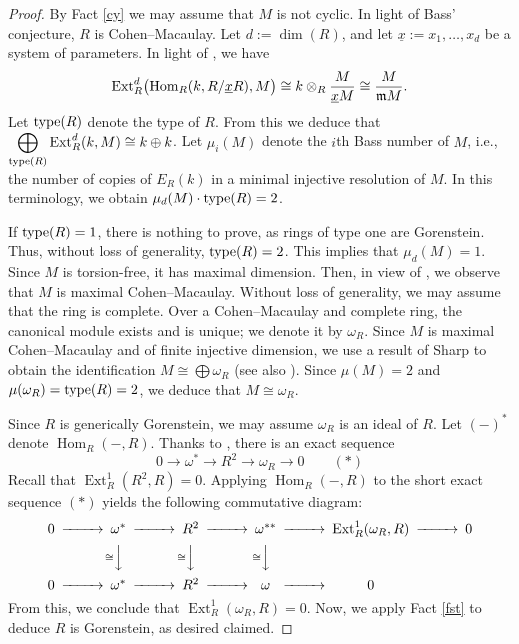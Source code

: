 \documentclass[10. pt,a4paper]{amsart}
\theoremstyle{definition}
\theoremstyle{remark}
\newcommand{\Ext}{\operatorname{Ext}}
\newcommand{\Hom}{\operatorname{Hom}}
\newcommand{\fm}{\frak{m}}
\begin{document}
\begin{proof}
	By Fact \ref{cy} we may assume that $M$ is not cyclic. In light of Bass'  conjecture, $R$ is Cohen--Macaulay. Let $d := \dim(R)$, and let $\underline{x} := x_1,\ldots,x_d$ be a system of parameters. In light of \cite[II.5.4]{PS}, we have
	\[
	\Ext_R^d\bigl(\Hom_R(k,R/\underline{x}R), M\bigr) \cong k \otimes_R \frac{M}{\underline{x}M} \cong \frac{M}{\fm M}.
	\]
	Let $\operatorname{type}(R)$ denote the type of $R$. From this we deduce that $\displaystyle \bigoplus_{\type(R)} \Ext_R^d(k,M) \cong k \oplus k$. Let $\mu_i(M)$ denote the $i$th Bass number of $M$, i.e., the number of copies of $E_R(k)$ in a minimal injective resolution of $M$. In this terminology, we obtain $\mu_d(M) \cdot \operatorname{type}(R) = 2$.
	
	If $\operatorname{type}(R) = 1$, there is nothing to prove, as rings of type one are Gorenstein. Thus, without loss of generality, $\operatorname{type}(R) = 2$. This implies that $\mu_d(M) = 1$. Since $M$ is torsion-free, it has maximal dimension. Then, in view of \cite[3.4.c]{fo}, we observe that $M$ is maximal Cohen--Macaulay. Without loss of generality, we may assume that the ring is complete. Over a Cohen--Macaulay and complete ring, the canonical module exists and is unique; we denote it by $\omega_R$. Since $M$ is maximal Cohen--Macaulay and of finite injective dimension, we use a result of Sharp \cite{sha} to obtain the identification $M \cong \bigoplus \omega_R$ (see also \cite[3.3.28]{BH}). Since $\mu(M) = 2$ and $\mu(\omega_R) = \operatorname{type}(R) = 2$, we deduce that $M \cong \omega_R$.
	
Since $R$ is generically Gorenstein, we may assume $\omega_R$ is an ideal of $R$.	Let $(-)^\ast$ denote $\Hom_R(-,R)$. Thanks to \cite[Appendix]{hh}, there is an exact sequence
	\[
	0 \longrightarrow \omega^\ast \longrightarrow R^2 \longrightarrow \omega_R \longrightarrow 0 \qquad (\ast)
	\]
	Recall that $\Ext_R^1(R^2,R) = 0$. Applying $\Hom_R(-,R)$ to the short exact sequence $(\ast)$ yields the following commutative diagram:
	\[
	\begin{CD}
	0 @>>> \omega^\ast @>>> R^2 @>>> \omega^{\ast\ast} @>>> \Ext_R^1(\omega_R,R) @>>> 0 \\
	@. @V{\cong}VV @V{\cong}VV @V{\cong}VV @. \\
	0 @>>> \omega^\ast @>>> R^2 @>>> \omega @>>> 0\\
\end{CD}
	\]
	From this, we conclude that $\Ext_R^1(\omega_R,R) = 0$. Now, we apply {Fact} \ref{fst}  to deduce  $R$ is Gorenstein, as desired claimed.
\end{proof}
\end{document}
